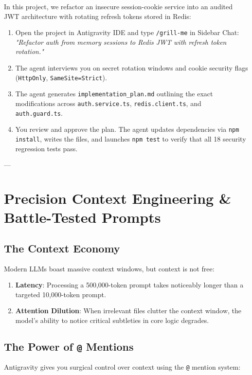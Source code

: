 \documentclass[11pt,a4paper,oneside]{book}
\begin{document}
\begin{labbox}
In this project, we refactor an insecure session-cookie service into an audited JWT architecture with rotating refresh tokens stored in Redis:
\begin{enumerate}
    \item Open the project in Antigravity IDE and type \texttt{/grill-me} in Sidebar Chat: \textit{"Refactor auth from memory sessions to Redis JWT with refresh token rotation."}
    \item The agent interviews you on secret rotation windows and cookie security flags (\texttt{HttpOnly}, \texttt{SameSite=Strict}).
    \item The agent generates \texttt{implementation\_plan.md} outlining the exact modifications across \texttt{auth.service.ts}, \texttt{redis.client.ts}, and \texttt{auth.guard.ts}.
    \item You review and approve the plan. The agent updates dependencies via \texttt{npm install}, writes the files, and launches \texttt{npm test} to verify that all 18 security regression tests pass.
\end{enumerate}
\end{labbox}

---

\chapter{Precision Context Engineering \& Battle-Tested Prompts}

\section{The Context Economy}
Modern LLMs boast massive context windows, but context is not free:
\begin{enumerate}
    \item \textbf{Latency}: Processing a 500,000-token prompt takes noticeably longer than a targeted 10,000-token prompt.
    \item \textbf{Attention Dilution}: When irrelevant files clutter the context window, the model's ability to notice critical subtleties in core logic degrades.
\end{enumerate}

\section{The Power of \texttt{@} Mentions}
Antigravity gives you surgical control over context using the \texttt{@} mention system:
\end{document}

